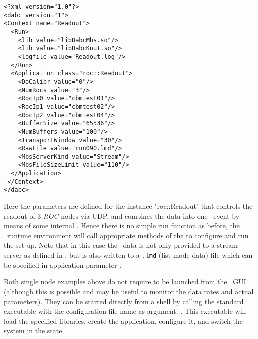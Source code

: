 \begin{small}
\begin{verbatim}
<?xml version="1.0"?>
<dabc version="1">
<Context name="Readout">
  <Run>
    <lib value="libDabcMbs.so"/>
    <lib value="libDabcKnut.so"/>
    <logfile value="Readout.log"/>
  </Run>
  <Application class="roc::Readout">
    <DoCalibr value="0"/>
    <NumRocs value="3"/>
    <RocIp0 value="cbmtest01"/>
    <RocIp1 value="cbmtest02"/>
    <RocIp2 value="cbmtest04"/>
    <BufferSize value="65536"/>
    <NumBuffers value="100"/>
    <TransportWindow value="30"/>
    <RawFile value="run090.lmd"/>
    <MbsServerKind value="Stream"/>
    <MbsFileSizeLimit value="110"/>
  </Application>
 </Context>
</dabc>
\end{verbatim}
\end{small}

Here the parameters are defined for the  instance
"roc::Readout" that controls  the readout of 3 {\em ROC} nodes via UDP, 
and combines the data into one \mbs\ event by means of some internal
. Hence there is no simple
run function as before, the \dabc\ runtime environment will call
appropriate methods of the  to configure and run
the set-up. Note that in this case the \mbs\ data is not only provided to a
stream server as defined in , but is also
written to a {\tt *.lmd} (list mode data) file which can be specified
in application parameter .

Both single node examples above do not require to be launched from the \dabc\ GUI (although this is possible and may be useful to monitor the data rates and actual parameters).
They can be started directly from a shell 
by calling the standard 
executable with the configuration file name as argument:
. 
This executable will load the specified libraries,
create the application, configure it, and switch the system in 
the  state.   

